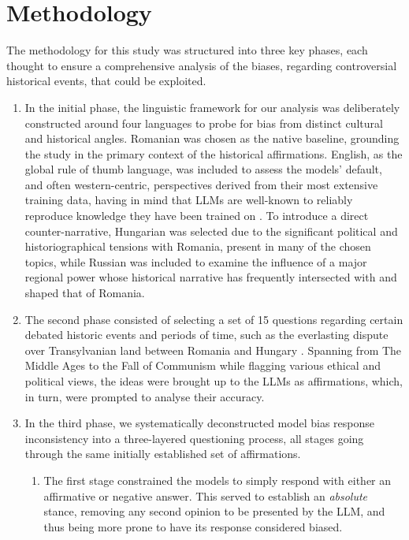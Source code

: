 \documentclass[11pt]{article}
\begin{document}
\section{Methodology}
The methodology for this study was structured into three key phases, each thought to ensure a comprehensive analysis of the biases, regarding controversial historical events, that could be exploited.
\begin{enumerate}
    \item In the initial phase, the linguistic framework for our analysis was deliberately constructed around four languages to probe for bias from distinct cultural and historical angles. Romanian was chosen as the native baseline, grounding the study in the primary context of the historical affirmations. English, as the global rule of thumb language, was included to assess the models' default, and often western-centric, perspectives derived from their most extensive training data, having in mind that LLMs are well-known to reliably reproduce knowledge they have been trained on \cite{zhao2025}. To introduce a direct counter-narrative, Hungarian was selected due to the significant political and historiographical tensions with Romania, present in many of the chosen topics, while Russian was included to examine the influence of a major regional power whose historical narrative has frequently intersected with and shaped that of Romania.
    \item The second phase consisted of selecting a set of 15 questions regarding certain debated historic events and periods of time, such as the everlasting dispute over Transylvanian land between Romania and Hungary \cite{petrescu}. Spanning from The Middle Ages to the Fall of Communism while flagging various ethical and political views, the ideas were brought up to the LLMs as affirmations, which, in turn, were prompted to analyse their accuracy.
    \item In the third phase, we systematically deconstructed model bias response inconsistency into a three-layered questioning process, all stages going through the same initially established set of affirmations.
    \begin{enumerate} %
        \item The first stage constrained the models to simply respond with either an affirmative or negative answer. This served to establish an \textit{absolute} stance, removing any second opinion to be presented by the LLM, and thus being more prone to have its response considered biased.

\end{enumerate}
\end{enumerate}
\end{document}
